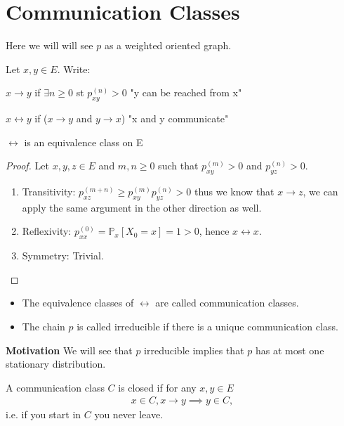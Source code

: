 \section{Communication Classes}
Here we will will see $p$ as a weighted oriented graph.
\begin{defn}
	Let $x,y \in E$. Write:
\itemize
\item $x \to y$ if $\exists  n \geq 0$ st $p_{xy}^{(n)}> 0$ "y can be reached from x"
\item $x \leftrightarrow y$ if ($x \to y$ and  $y\to x $) "x and y communicate"
\end{defn}

\begin{prop}[]
	$\leftrightarrow$ is an equivalence class on E
\end{prop}
\begin{proof}
	Let $x,y,z \in E$ and $m,n \geq 0$ such that $p_{xy}^{(m)}>0$ and $p_{yz}^{(n)}>0$.
\begin{enumerate}
	\item Transitivity: $p_{xz}^{(m+n)} \geq p_{xy}^{(m)}p_{yz}^{(n)} >0$ thus we know that $x\rightarrow z$, we can apply the same argument in the other direction as well. 
	\item Reflexivity: $p_{xx}^{(0)} = \mathbb{P}_{x} \left[ X_0 = x \right] =1>0$, hence $ x \leftrightarrow x$. 
	\item Symmetry: Trivial.
\end{enumerate}
\end{proof}


\begin{defn} \hfill
\begin{itemize}
\item The equivalence classes of $\leftrightarrow$ are called communication classes.
\item The chain $p$ is called irreducible if there is a unique communication class.
\end{itemize}
\end{defn}

\noindent
\textbf{Motivation} We will see that $p$ irreducible implies that $p$ has at most one stationary distribution.

\begin{defn}
	A communication class $C$ is closed if for any $x,y \in E$
\begin{align}
 x \in C, x \to y \implies y \in C,
\end{align}
i.e. if you start in $C$ you never leave.
\end{defn}

